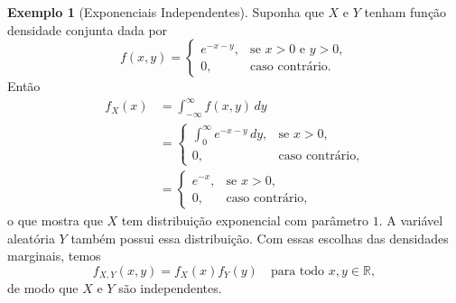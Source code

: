 \documentclass[12pt,portuguese]{article}
\theoremstyle{definition}
\newtheorem{example}[example]{Exemplo}
\theoremstyle{plainexercise}
\theoremstyle{starredexercise}
\theoremstyle{definition}
\begin{document}
\begin{example}[Exponenciais Independentes]\label{ex:exponenciais-independentes}
  Suponha que $X$ e $Y$ tenham função densidade conjunta dada por
  \[
    f(x, y) =
    \begin{cases}
      e^{-x-y}, & \text{se } x > 0 \text{ e } y > 0, \\[0.2cm]
      0, & \text{caso contrário}.
    \end{cases}
  \]
  Então
  \[
    \begin{aligned}
      f_X(x)
      &= \int_{-\infty}^{\infty} f(x, y)\,dy
      \\[0.3cm]
      &= \begin{cases}
        \displaystyle\int_0^{\infty} e^{-x-y}\,dy,
        & \text{se } x > 0, \\[0.2cm]
        0, & \text{caso contrário},
      \end{cases}
      \\[0.3cm]
      &= \begin{cases}
        e^{-x}, & \text{se } x > 0, \\[0.2cm]
        0, & \text{caso contrário},
      \end{cases}
    \end{aligned}
  \]
  o que mostra que $X$ tem distribuição exponencial com parâmetro $1$. A
  variável aleatória $Y$ também possui essa distribuição. Com essas
  escolhas das densidades marginais, temos
  \[
    f_{X,Y}(x, y) = f_X(x)f_Y(y) \quad \text{para todo } x, y \in \mathbb{R},
  \]
  de modo que $X$ e $Y$ são independentes.
\end{example}
\end{document}
